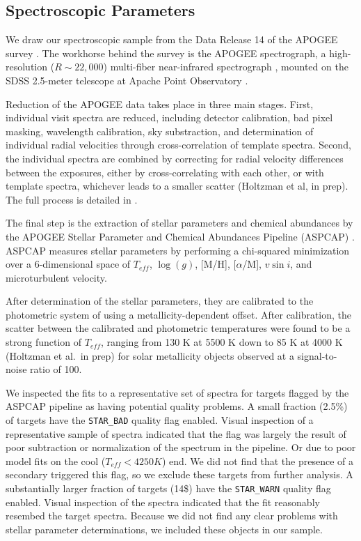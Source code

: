 \documentclass[manuscript]{aastex6}
\newcommand{\vsini}{\ensuremath{v \sin i}}
\newcommand{\Teff}{\ensuremath{T_{eff}}}
\newcommand{\logg}{\ensuremath{\log(g)}}
\newcommand{\STARBAD}{\texttt{STAR\_BAD}}
\newcommand{\STARWARN}{\texttt{STAR\_WARN}}
\begin{document}
\subsection{Spectroscopic Parameters}

We draw our spectroscopic sample from the Data Release 14 \citep{Abolfathi18}
of the APOGEE survey \citep{Majewski17}. The workhorse behind the survey is the
APOGEE spectrograph, a high-resolution (\(R \sim 22,000\)) multi-fiber
near-infrared spectrograph \citep{Wilson10}, mounted on the SDSS 2.5-meter
telescope at Apache Point Observatory \citep{Gunn06}.

Reduction of the APOGEE data takes place in three main stages. First,
individual visit spectra are reduced, including detector calibration, bad pixel
masking, wavelength calibration, sky substraction, and determination of
individual radial velocities through cross-correlation of template spectra.
Second, the individual spectra are combined by correcting for radial velocity
differences between the exposures, either by cross-correlating with each other,
or with template spectra, whichever leads to a smaller scatter (Holtzman et
al, in prep). The full process is detailed in \citet{Nidever15}.

The final step is the extraction of stellar parameters and chemical abundances
by the APOGEE Stellar Parameter and Chemical Abundances Pipeline (ASPCAP)
\citep{GarciaPerez16}. ASPCAP measures stellar parameters by performing a
chi-squared minimization \citep{AllendePrieto06} over a 6-dimensional space of
\Teff, \logg, [M/H], [\(\alpha\)/M], \vsini, and microturbulent velocity.

After determination of the stellar parameters, they are calibrated to the
photometric system of \citet{GonzalezHernandez09} using a metallicity-dependent
offset. After calibration, the scatter between the calibrated and photometric
temperatures  were found to be a strong function of \Teff{}, ranging from 130 
K at 5500 K down to 85 K at 4000 K (Holtzman et al.\ in prep) for solar
metallicity objects observed at a signal-to-noise ratio of 100. 

We inspected the fits to a representative set of spectra for targets flagged 
by the ASPCAP pipeline as having potential quality problems. A small fraction
(2.5\%) of targets have the \STARBAD{} quality flag enabled. Visual inspection
of a representative sample of spectra indicated that the flag was largely the
result of poor subtraction or normalization of the spectrum in the pipeline. Or
due to poor model fits on the cool (\(\Teff < 4250 K\)) end. We did not find
that the presence of a secondary triggered this flag, so we exclude these
targets from further analysis. A substantially larger fraction of targets
(14\$) have the \STARWARN{} quality flag enabled. Visual inspection of the
spectra indicated that the fit reasonably resembed the target spectra. Because
we did not find any clear problems with stellar parameter determinations, we 
included these objects in our sample.
\end{document}
